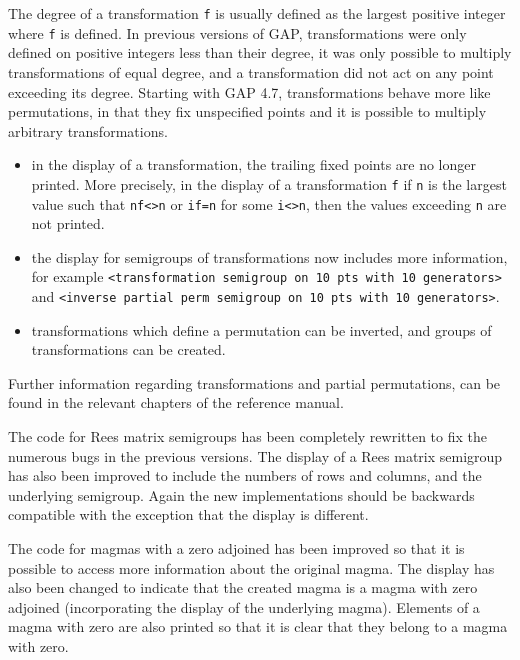 \documentclass[a4paper,11pt]{report}
\begin{document}
{{{\begin{itemize}
 The degree of a transformation \texttt{f} is usually defined as the largest positive integer where \texttt{f} is defined. In previous versions of \textsf{GAP}, transformations were only defined on positive integers less than their
degree, it was only possible to multiply transformations of equal degree, and
a transformation did not act on any point exceeding its degree. Starting with \textsf{GAP} 4.7, transformations behave more like permutations, in that they fix
unspecified points and it is possible to multiply arbitrary transformations. 
\begin{itemize}
\item  in the display of a transformation, the trailing fixed points are no longer
printed. More precisely, in the display of a transformation \texttt{f} if \texttt{n} is the largest value such that \texttt{n\texttt{}f{\textless}{\textgreater}n} or \texttt{i\texttt{}f=n} for some \texttt{i{\textless}{\textgreater}n}, then the values exceeding \texttt{n} are not printed. 
\item  the display for semigroups of transformations now includes more information,
for example \texttt{{\textless}transformation semigroup on 10 pts with 10 generators{\textgreater}} and \texttt{{\textless}inverse partial perm semigroup on 10 pts with 10
generators{\textgreater}}. 
\item  transformations which define a permutation can be inverted, and groups of
transformations can be created. 
\end{itemize}
 Further information regarding transformations and partial permutations, can be
found in the relevant chapters of the reference manual. 

 The code for Rees matrix semigroups has been completely rewritten to fix the
numerous bugs in the previous versions. The display of a Rees matrix semigroup
has also been improved to include the numbers of rows and columns, and the
underlying semigroup. Again the new implementations should be backwards
compatible with the exception that the display is different. 

 The code for magmas with a zero adjoined has been improved so that it is
possible to access more information about the original magma. The display has
also been changed to indicate that the created magma is a magma with zero
adjoined (incorporating the display of the underlying magma). Elements of a
magma with zero are also printed so that it is clear that they belong to a
magma with zero. 


\end{itemize}}}}
\end{document}
